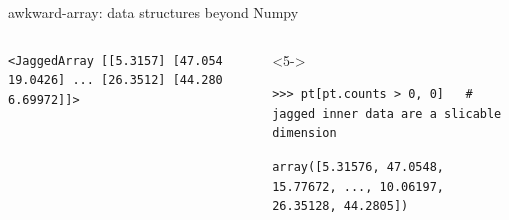\documentclass[aspectratio=169]{beamer}
\begin{document}
\begin{frame}[fragile]{awkward-array: data structures beyond Numpy}
\begin{columns}
\begin{uncoverenv}
\vspace{-0.6 cm}
\color{darkblue}\begin{verbatim}
<JaggedArray [[5.3157] [47.054 19.0426] ... [26.3512] [44.280 6.69972]]>
\end{verbatim}
\color{black}
\end{uncoverenv}

\begin{uncoverenv}<5->
\vspace{-0.6 cm}
\begin{verbatim}
>>> pt[pt.counts > 0, 0]   # jagged inner data are a slicable dimension
\end{verbatim}

\vspace{-0.6 cm}
\color{darkblue}\begin{verbatim}
array([5.31576, 47.0548, 15.77672, ..., 10.06197, 26.35128, 44.2805])
\end{verbatim}
\color{black}
\end{uncoverenv}
\end{columns}
\end{frame}
\end{document}
